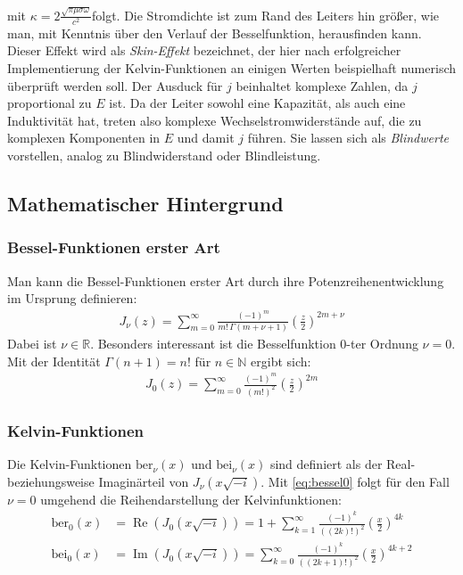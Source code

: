\documentclass[10pt,a4paper]{article}
\begin{document}
mit $\kappa=2\frac{\sqrt{\pi\mu\sigma\omega}}{c^2}$folgt. Die Stromdichte ist zum Rand des Leiters hin größer, wie man, mit Kenntnis über den Verlauf der Besselfunktion, herausfinden kann. Dieser Effekt wird als \emph{Skin-Effekt} bezeichnet, der hier nach erfolgreicher Implementierung der Kelvin-Funktionen an einigen Werten beispielhaft numerisch überprüft werden soll. Der Ausduck für $j$ beinhaltet komplexe Zahlen, da $j$ proportional zu $E$ ist. Da der Leiter sowohl eine Kapazität, als auch eine Induktivität hat, treten also komplexe Wechselstromwiderstände auf, die zu komplexen Komponenten in $E$ und damit $j$ führen. Sie lassen sich als \emph{Blindwerte} vorstellen, analog zu Blindwiderstand oder Blindleistung.
\subsection{Mathematischer Hintergrund}

\subsubsection{Bessel-Funktionen erster Art}

Man kann die Bessel-Funktionen erster Art durch ihre Potenzreihenentwicklung im Ursprung definieren:
\begin{align}
	J_\nu(z) = \sum^{\infty}_{m=0} \frac{\left( -1 \right)^m}{m! \, \Gamma(m + \nu + 1)} \left(\frac{z}{2}\right)^{2m+\nu}
\end{align}
Dabei ist $\nu \in \mathbb{R}$. Besonders interessant ist die Besselfunktion 0-ter Ordnung $\nu = 0$.
Mit der Identität $\Gamma(n+1) = n!$ für $n \in \mathbb{N}$ ergibt sich:
\begin{align}
	\label{eq:bessel0}
	J_0(z) = \sum^{\infty}_{m=0} \frac{\left( -1 \right)^m}{\left( m! \right)^2} \left( \frac{z}{2} \right)^{2m}
\end{align}

\subsubsection{Kelvin-Funktionen}

Die Kelvin-Funktionen $\mathrm{ber}_\nu(x)$ und $\mathrm{bei}_\nu(x)$ sind definiert als der Real-
beziehungsweise Imaginärteil von $J_\nu(x \sqrt{-i} )$. Mit \ref{eq:bessel0}
folgt für den Fall $\nu = 0$ umgehend die Reihendarstellung der Kelvinfunktionen:
\begin{align}
	\mathrm{ber}_0(x) &= \operatorname{Re}\left(J_0(x \sqrt{-i} )\right) = 1 + \sum^{\infty}_{k=1} \frac{\left( -1 \right)^k}{\left( \left(2k\right)! \right)^2} \left( \frac{x}{2} \right)^{4k} \label{eq:berpotenzreihe}\\
	\mathrm{bei}_0(x) &= \operatorname{Im}\left(J_0(x \sqrt{-i} )\right) = \sum^{\infty}_{k=0} \frac{\left( -1 \right)^k}{\left( \left(2k+1\right)! \right)^2} \left( \frac{x}{2} \right)^{4k+2}\label{eq:beipotenzreihe}
\end{align}
\end{document}
